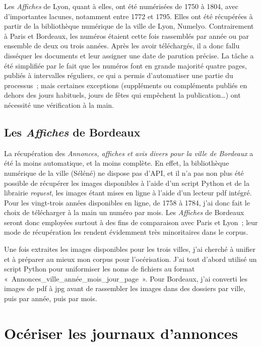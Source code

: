 Les \textit{Affiches} de Lyon, quant à elles, ont été numérisées de 1750 à 1804, avec d’importantes lacunes, notamment entre 1772 et 1795. Elles ont été récupérées à partir de la bibliothèque numérique de la ville de Lyon, Numelyo. Contrairement à Paris et Bordeaux, les numéros étaient cette fois rassemblés par année ou par ensemble de deux ou trois années. Après les avoir téléchargés, il a donc fallu disséquer les documents et leur assigner une date de parution précise. La tâche a été simplifiée par le fait que les numéros font en grande majorité quatre pages, publiés à intervalles réguliers, ce qui a permis d’automatiser une partie du processus ; mais certaines exceptions (suppléments ou compléments publiés en dehors des jours habituels, jours de fêtes qui empêchent la publication…) ont nécessité une vérification à la main. 


\section{Les \textit{Affiches} de Bordeaux}

La récupération des \textit{Annonces, affiches et avis divers pour la ville de Bordeaux} a été la moins automatique, et la moins complète. En effet, la bibliothèque numérique de la ville (Séléné) ne dispose pas d’API, et il n’a pas non plus été possible de récupérer les images disponibles à l’aide d’un script Python et de la librairie \textit{request}, les images étant mises en ligne à l’aide d’un lecteur pdf intégré.
Pour les vingt-trois années disponibles en ligne, de 1758 à 1784, j’ai donc fait le choix de télécharger à la main un numéro par mois. Les \textit{Affiches} de Bordeaux seront donc employées surtout à des fins de comparaison avec Paris et Lyon ; leur mode de récupération les rendent évidemment très minoritaires dans le corpus.

\bigskip

Une fois extraites les images disponibles pour les trois villes, j’ai cherché à unifier et à préparer au mieux mon corpus pour l’océrisation. J’ai tout d’abord utilisé un script Python pour uniformiser les noms de fichiers au format « Annonces\_ville\_année\_mois\_jour\_page ». Pour Bordeaux, j’ai converti les images de pdf à jpg avant de rassembler les images dans des dossiers par ville, puis par année, puis par mois.



\chapter{Océriser les journaux d'annonces}

